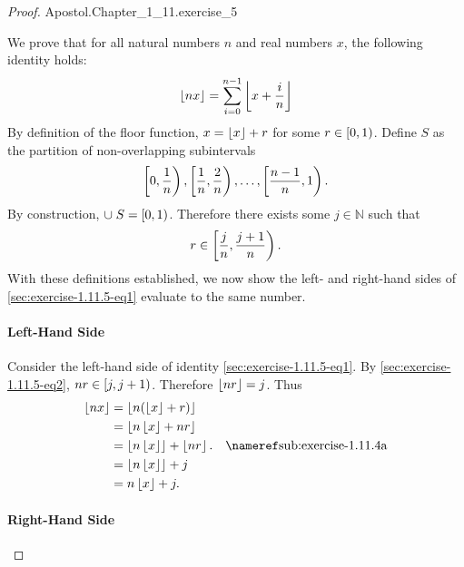 \documentclass{report}
\begin{document}
\begin{proof}

    {Apostol.Chapter\_1\_11.exercise\_5}

  We prove that for all natural numbers $n$ and real numbers $x$, the following
    identity holds:
    \begin{equation}
      \label{sec:exercise-1.11.5-eq1}
      \left\lfloor nx\right\rfloor = \sum_{i=0}^{n-1} \left\lfloor x + \frac{i}{n}\right\rfloor
    \end{equation}
  By definition of the floor function, $x = \left\lfloor x\right\rfloor + r$ for some
    $r \in \left[0, 1\right)$.
  Define $S$ as the partition of non-overlapping subintervals
    $$\left[0, \frac{1}{n}\right), \left[\frac{1}{n}, \frac{2}{n}\right), \ldots,
      \left[\frac{n-1}{n}, 1\right).$$
  By construction, $\cup\; S = \left[0, 1\right)$.
  Therefore there exists some $j \in \mathbb{N}$ such that
    \begin{equation}
      \label{sec:exercise-1.11.5-eq2}
      r \in \left[\frac{j}{n}, \frac{j+1}{n}\right).
    \end{equation}
  With these definitions established, we now show the left- and right-hand sides
    of \eqref{sec:exercise-1.11.5-eq1} evaluate to the same number.

  \paragraph{Left-Hand Side}%

    Consider the left-hand side of identity \eqref{sec:exercise-1.11.5-eq1}.
    By \eqref{sec:exercise-1.11.5-eq2}, $nr \in \left[j, j + 1\right)$.
    Therefore $\left\lfloor nr\right\rfloor = j$.
    Thus
      \begin{align}
        \floor{nx}
          & = \floor{n(\floor{x} + r)} \nonumber \\
          & = \floor{n\floor{x} + nr} \nonumber \\
          & = \floor{n\floor{x}} + \floor{nr}. \nonumber
            & \textref{sub:exercise-1.11.4a} \\
          & = \floor{n\floor{x}} + j \nonumber \\
          & = n\floor{x} + j. \label{sec:exercise-1.11.5-eq3}
      \end{align}

  \paragraph{Right-Hand Side}%


\end{proof}
\end{document}
